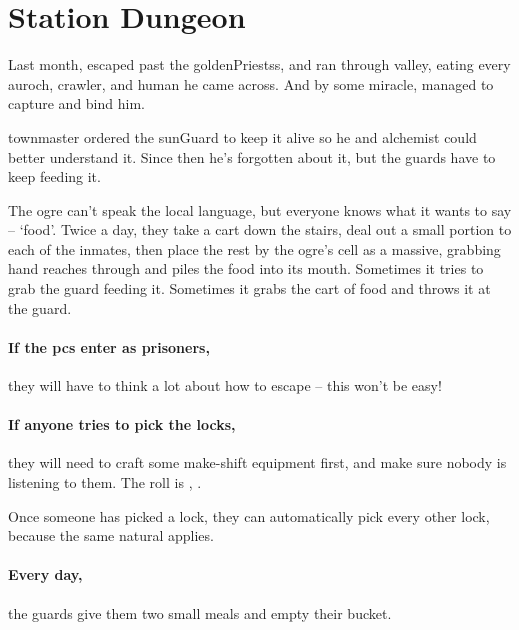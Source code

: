 \prisonMap

\section{Station Dungeon}
\label{stationDungeon}

\begin{multicols}{2}

\begin{exampletext}
  \noindent
  Last month,  escaped past the \glspl{goldenPriests}, and ran through \gls{valley}, eating every auroch, \gls{crawler}, and human he came across.
  And by some miracle,  managed to capture and bind him.

  \Gls{townmaster} ordered the \gls{sunGuard} to keep it alive so he and \gls{alchemist} could better understand it.
  Since then he's forgotten about it, but the guards have to keep feeding it.

  The \gls{ogre} can't speak the local language, but everyone knows what it wants to say -- `food'.
  Twice a day, they take a cart down the stairs, deal out a small portion to each of the inmates, then place the rest by the ogre's cell as a massive, grabbing hand reaches through and piles the food into its mouth.
  Sometimes it tries to grab the guard feeding it.
  Sometimes it grabs the cart of food and throws it at the guard.
\end{exampletext}

\paragraph{If the \glspl{pc} enter as prisoners,}
they will have to think a lot about how to escape -- this won't be easy!

\paragraph{If anyone tries to pick the locks,}
they will need to craft some make-shift equipment first, and make sure nobody is listening to them.
The roll is , \tn[12].

Once someone has picked a lock, they can automatically pick every other lock, because the same \gls{natural} applies.

\paragraph{Every day,}
the guards give them two small meals and empty their bucket.


\end{multicols}
